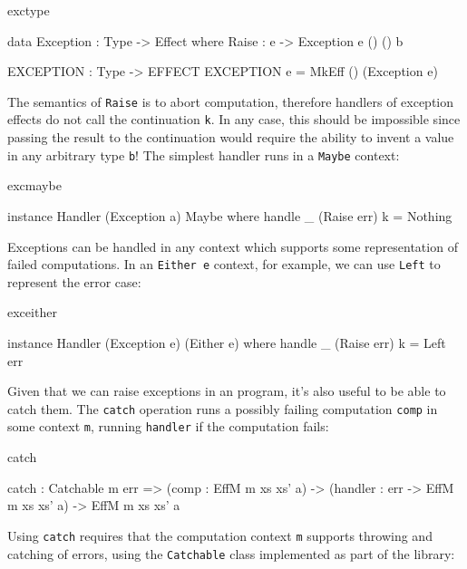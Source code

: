 \begin{SaveVerbatim}{exctype}

data Exception : Type -> Effect where
     Raise : e -> Exception e () () b 

EXCEPTION : Type -> EFFECT
EXCEPTION e = MkEff () (Exception e) 

\end{SaveVerbatim}

\noindent
The semantics of \texttt{Raise} is to abort computation, therefore handlers
of exception effects do not call the continuation \texttt{k}. In any case, 
this should be impossible since passing the result to the continuation would
require the ability to invent a value in any arbitrary type \texttt{b}!
The simplest handler runs in a \texttt{Maybe} context:

\begin{SaveVerbatim}{excmaybe}

instance Handler (Exception a) Maybe where
     handle _ (Raise err) k = Nothing

\end{SaveVerbatim}

\noindent
Exceptions can be handled in any context which supports some representation of
failed computations. In an \texttt{Either e} context, for example, we can
use \texttt{Left} to represent the error case:

\begin{SaveVerbatim}{exceither}

instance Handler (Exception e) (Either e) where
     handle _ (Raise err) k = Left err

\end{SaveVerbatim}

\noindent
Given that we can raise exceptions in an \Eff{} program, it's also useful to be
able to catch them. The \texttt{catch} operation runs a possibly failing
computation \texttt{comp} in some context \texttt{m}, running \texttt{handler}
if the computation fails:

\begin{SaveVerbatim}{catch}

catch : Catchable m err =>
        (comp : EffM m xs xs' a) -> 
        (handler : err -> EffM m xs xs' a) ->
        EffM m xs xs' a

\end{SaveVerbatim}

\noindent
Using \texttt{catch} requires that the computation context \texttt{m} supports
throwing and catching of errors, using the \texttt{Catchable} class implemented
as part of the \Idris{} library:

